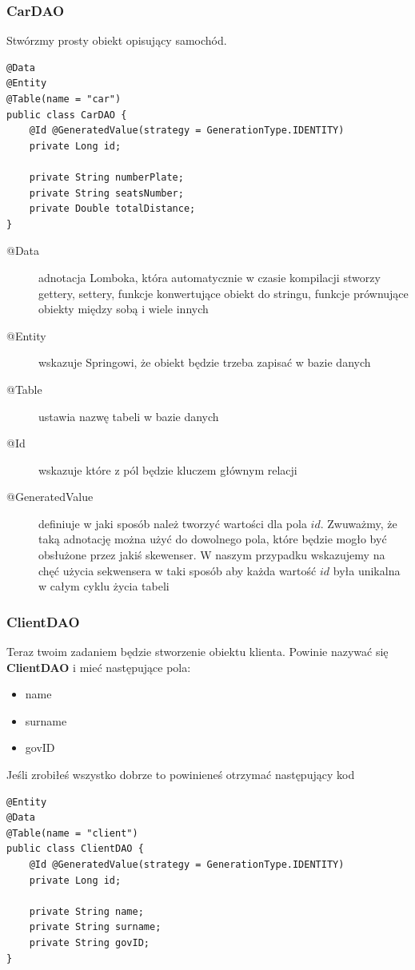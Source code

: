 \documentclass{article}
\begin{document}
            \subsubsection{CarDAO}
                Stwórzmy prosty obiekt opisujący samochód.
                \begin{verbatim}
@Data
@Entity
@Table(name = "car")
public class CarDAO {
    @Id @GeneratedValue(strategy = GenerationType.IDENTITY)
    private Long id;

    private String numberPlate;
    private String seatsNumber;
    private Double totalDistance;
}
                \end{verbatim}
                \begin{description}
                \item[@Data] adnotacja Lomboka, która automatycznie w czasie kompilacji stworzy gettery, settery, funkcje konwertujące obiekt do stringu, funkcje prównujące obiekty między sobą i wiele innych
                \item[@Entity] wskazuje Springowi, że obiekt będzie trzeba zapisać w bazie danych
                \item[@Table] ustawia nazwę tabeli w bazie danych
                \item[@Id] wskazuje które z pól będzie kluczem głównym relacji
                \item[@GeneratedValue] definiuje w jaki sposób należ tworzyć wartości dla pola $id$. Zwuważmy, że taką adnotację można użyć do dowolnego pola, które będzie mogło być obsłużone przez jakiś skewenser. W naszym przypadku wskazujemy na chęć użycia sekwensera w taki sposób aby każda wartość $id$ była unikalna w całym cyklu życia tabeli   
                \end{description}
            \subsubsection{ClientDAO}
                Teraz twoim zadaniem będzie stworzenie obiektu klienta. Powinie nazywać się \textbf{ClientDAO} i mieć następujące pola:
                \begin{itemize}
                    \item name
                    \item surname
                    \item govID
                \end{itemize}
                Jeśli zrobiłeś wszystko dobrze to powinieneś otrzymać następujący kod
                \begin{verbatim}
@Entity
@Data
@Table(name = "client")
public class ClientDAO {
    @Id @GeneratedValue(strategy = GenerationType.IDENTITY)
    private Long id;

    private String name;
    private String surname;
    private String govID;
}
            \end{verbatim}
\end{document}
